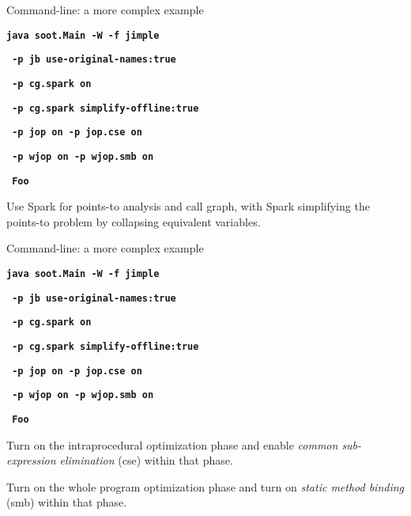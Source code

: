 \begin{slide}{Command-line: a more complex example}

\begin{small}
\textbf{\texttt{java soot.Main -W -f jimple}}

\textbf{\texttt{     -p jb use-original-names:true }}

\textbf{\red\texttt{     -p cg.spark on }}

\textbf{\red\texttt{     -p cg.spark simplify-offline:true}}

\textbf{\texttt{     -p jop on -p jop.cse on   }}

\textbf{\texttt{     -p wjop on  -p wjop.smb on }}

\textbf{\texttt{     Foo }}
\end{small}

\vspace{.2in}

Use Spark for points-to analysis and
call graph,  with Spark simplifying the points-to problem by collapsing
equivalent variables.  

\end{slide}


\begin{slide}{Command-line: a more complex example}

\begin{small}
\textbf{\texttt{java soot.Main -W -f jimple}}

\textbf{\texttt{     -p jb use-original-names:true }}

\textbf{\texttt{     -p cg.spark on }}

\textbf{\texttt{     -p cg.spark simplify-offline:true}}

\textbf{\red\texttt{     -p jop on -p jop.cse on   }}

\textbf{\red\texttt{     -p wjop on  -p wjop.smb on }}

\textbf{\texttt{     Foo }}
\end{small}

\vspace{.2in}

\begin{footnotesize}
Turn on 
the intraprocedural optimization phase and enable 
\textit{common sub-expression elimination} (cse) within that phase.

Turn on the whole program optimization phase and
turn on \textit{static method binding} (smb) within that phase.
\end{footnotesize}

\end{slide}

